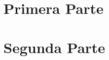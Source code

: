 \documentclass[11pt,letterpaper]{article}
\title{}
\author{}
\begin{document}


\section{Primera Parte}

\newpage

\section{Segunda Parte}

\newpage
\end{document}

